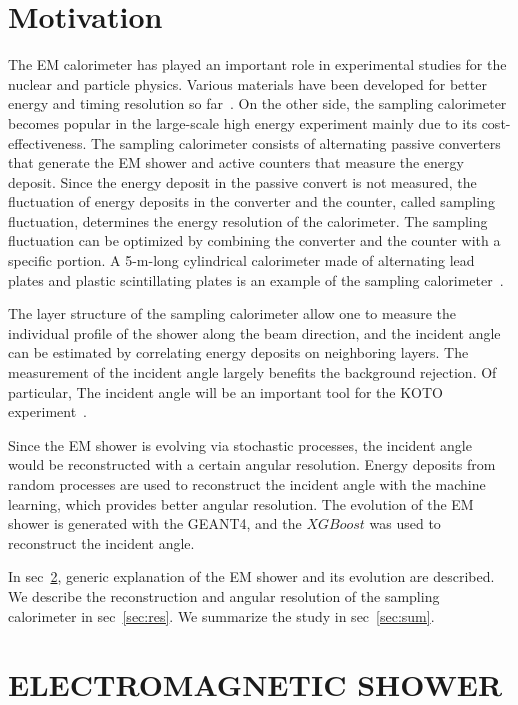 \documentclass[jkps,preprint,fleqn,showpacs,showkeys]{revtex4}
\newcommand{\XGB}{XGBoost}
\begin{document}
\section{Motivation}
\label{sec:mot}
The EM calorimeter has played an important role in experimental studies for the nuclear and particle physics. Various materials have been developed for better energy and timing resolution so far~\cite{Calorimeter}. On the other side, the sampling calorimeter becomes popular in the large-scale high energy experiment mainly due to its cost-effectiveness. The sampling calorimeter consists of alternating passive converters that generate the EM shower and active counters that measure the energy deposit. Since the energy deposit in the passive convert is not measured, the fluctuation of energy deposits in the converter and the counter, called sampling fluctuation, determines the energy resolution of the calorimeter. The sampling fluctuation can be optimized by combining the converter and the counter with a specific portion. A 5-m-long cylindrical calorimeter made of alternating lead plates and plastic scintillating plates is an example of the sampling calorimeter~\cite{E391a_barrel}.

The layer structure of the sampling calorimeter allow one to measure the individual profile of the shower along the beam direction, and the incident angle can be estimated by correlating energy deposits on neighboring layers. The measurement of the incident angle largely benefits the background rejection. Of particular, The incident angle will be an important tool for the KOTO experiment~\cite{KOTOproposal}.

Since the EM shower is evolving via stochastic processes, the incident angle would be reconstructed with a certain angular resolution. Energy deposits from random processes are used to reconstruct the incident angle with the machine learning, which provides better angular resolution. The evolution of the EM shower is generated with the GEANT4, and the $\XGB$ was used to reconstruct the incident angle.

In sec~\ref{sec:ems}, generic explanation of the EM shower and its evolution are described. We describe the reconstruction and angular resolution of the sampling calorimeter in sec~\ref{sec:res}. We summarize the study in sec~\ref{sec:sum}.

\section{ELECTROMAGNETIC SHOWER}
\label{sec:ems}
\end{document}
